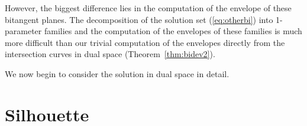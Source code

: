 \documentclass[12pt]{article}
\newif\ifJournal
\newcommand{\bisilhouette}{bisilhouette\ }
\newcommand{\Bisilhouette}{bisilhouette}
\begin{document}
However, the biggest difference lies in the computation of the envelope
of these bitangent planes.
The decomposition of the solution set (\ref{eq:otherbi}) into
1-parameter families and the computation of the envelopes of these families
is much more difficult than our trivial computation of the envelopes
directly from the intersection curves in dual space
(Theorem~\ref{thm:bidev2}).

We now begin to consider the solution in dual space in detail.

\section{Silhouette}

\ifJournal
A closely related construct to the \bisilhouette is the silhouette,
which is a special case of the \bisilhouette
where one of the surfaces becomes a point.
There has been much work on the silhouette of smooth surfaces.
Schweitzer and Cobb \cite{schweitzer82} use the intersection of a plane with
Catmull's normal surface to compute the silhouette.
Sederberg and Zundel \cite{sederberg89}
compute the silhouette of an algebraic surface using polar surfaces.
Elber and Cohen \cite{elber90} compute the silhouette of a parametric
surface using subdivision.
Krishnan and Manocha \cite{krishnan94} express the silhouette as a determinant.
There are also many algorithms for silhouettes of polyhedral meshes.
Of these, \cite{zorin00} is notable since the silhouette is computed 
in dual space, by intersecting a plane with a dual mesh.
Points at infinity are dealt with by identifying projective 3-space with
the boundary of a hypercube in 4-space.
\fi

\end{document}
